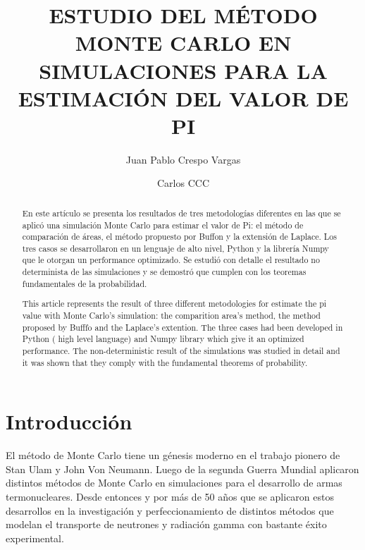 \documentclass{rbf}
\begin{document}
\title{ESTUDIO DEL MÉTODO MONTE CARLO EN SIMULACIONES PARA LA ESTIMACIÓN DEL VALOR DE PI}

\author{Juan Pablo Crespo Vargas\marca{*}}
%


\author{Carlos CCC \marca{**}}
%


\begin{abstract}
\Resumen
En este artículo se presenta los resultados de tres metodologías diferentes en las que se aplicó una simulación Monte Carlo para estimar el valor de Pi: el método de comparación de áreas, el método propuesto por Buffon y la extensión de Laplace. Los tres casos se desarrollaron en un lenguaje de alto nivel, Python y la librería Numpy que le otorgan un performance optimizado. Se estudió con detalle el resultado no determinista de las simulaciones y se demostró que cumplen con los teoremas fundamentales de la probabilidad.



\Abstract
This article represents the result of three different metodologies for estimate the pi value with Monte Carlo's simulation: the comparition area's method, the method proposed by Bufffo and the Laplace's extention. The three cases had been developed in  Python ( high level language) and Numpy library which give it an optimized performance. The non-deterministic result of the simulations was studied in detail and it was shown that they comply with the fundamental theorems of probability.

\end{abstract}

\maketitle


\section{Introducción}\label{intro}
El método de Monte Carlo tiene un génesis moderno en el trabajo pionero de Stan Ulam y John Von Neumann. Luego de la segunda Guerra Mundial aplicaron distintos métodos de Monte Carlo en simulaciones para el desarrollo de armas termonucleares. Desde entonces y por más de 50 años que se aplicaron estos desarrollos en la investigación y perfeccionamiento de distintos métodos que modelan el transporte de neutrones y radiación gamma con bastante éxito experimental\cite{Kling}. 
\end{document}
